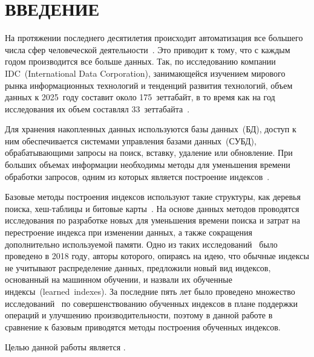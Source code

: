 \chapter*{ВВЕДЕНИЕ}

На протяжении последнего десятилетия происходит автоматизация все большего числа
сфер человеческой деятельности~\cite{koptenok}. Это приводит к тому, что с
каждым годом производится все больше данных. Так, по исследованию компании
IDC~(International Data Corporation), занимающейся изучением мирового рынка
информационных технологий и тенденций развития технологий, объем данных к
2025~году составит около 175~зеттабайт, в то время как на год исследования их
объем составлял 33~зеттабайта~\cite{idc}.

Для хранения накопленных данных используются базы данных~(БД), доступ к ним
обеспечивается системами управления базами данных~(СУБД), обрабатывающими
запросы на поиск, вставку, удаление или обновление. При больших объемах
информации необходимы методы для уменьшения времени обработки запросов, одним из
которых является построение индексов~\cite{bits}.

Базовые методы построения индексов используют такие структуры, как деревья
поиска, хеш-таблицы и битовые карты~\cite{dama}. На основе данных методов
проводятся исследования по разработке новых для уменьшения времени поиска и
затрат на перестроение индекса при изменении данных, а также сокращения
дополнительно используемой памяти. Одно из таких исследований~\cite{main} было
проведено в 2018 году, авторы которого, опираясь на идею, что обычные индексы не
учитывают распределение данных, предложили новый вид индексов, основанный на
машинном обучении, и назвали их обученные индексы~(learned~indexes). За
последние пять лет было проведено множество исследований~\cite{alex, apex,
ulipp, pgmi} по совершенствованию обученных индексов в плане поддержки операций
и улучшению производительности, поэтому в данной работе в сравнение к базовым
приводятся методы построения обученных индексов.


Целью данной работы является .

